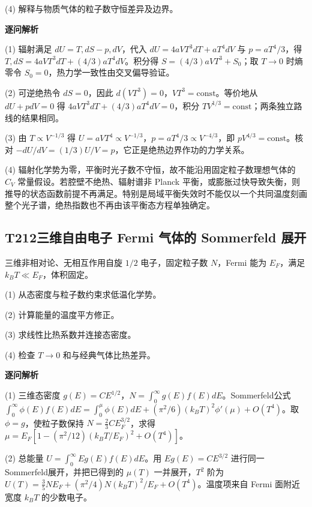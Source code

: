 (4) 解释与物质气体的粒子数守恒差异及边界。

\par\textbf{逐问解析}

(1) 辐射满足 $dU=T,dS-p,dV$，代入 $dU=4aVT^3dT+aT^4dV$ 与 $p=aT^4/3$，得 $T,dS=4aVT^3dT+(4/3)aT^4dV$。积分得 $S=(4/3)aVT^3+S_0$；取 $T\to0$ 时熵零令 $S_0=0$，热力学一致性由交叉偏导验证。

(2) 可逆绝热令 $dS=0$，因此 $d(VT^3)=0$，$VT^3=\mathrm{const}$。等价地从 $dU+pdV=0$ 得 $4aVT^3dT+(4/3)aT^4dV=0$，积分 $TV^{1/3}=\mathrm{const}$；两条独立路线的结果相同。

(3) 由 $T\propto V^{-1/3}$ 得 $U=aVT^4\propto V^{-1/3}$，$p=aT^4/3\propto V^{-4/3}$，即 $pV^{4/3}=\mathrm{const}$。核对 $-dU/dV=(1/3)U/V=p$，它正是绝热边界作功的力学关系。

(4) 辐射化学势为零，平衡时光子数不守恒，故不能沿用固定粒子数理想气体的 $C_V$ 常量假设。若腔壁不绝热、辐射谱非 Planck 平衡，或膨胀过快导致失衡，则推导的状态函数前提不再满足。特别是局域平衡失效时不能仅以一个共同温度刻画整个光子谱，绝热指数也不再由该平衡态方程单独确定。

\par\medskip

\subsection*{T212\quad 三维自由电子 Fermi 气体的 Sommerfeld 展开}

三维非相对论、无相互作用自旋 $1/2$ 电子，固定粒子数 $N$，Fermi 能为 $E_F$，满足 $k_BT\ll E_F$，体积固定。

(1) 从态密度与粒子数约束求低温化学势。

(2) 计算能量的温度平方修正。

(3) 求线性比热系数并连接态密度。

(4) 检查 $T\to0$ 和与经典气体比热差异。

\par\textbf{逐问解析}

(1) 三维态密度 $g(E)=CE^{1/2}$，$N=\int_0^\infty g(E)f(E)dE$。Sommerfeld公式 $\int_0^\infty\phi(E)f(E)dE=\int_0^\mu\phi(E)dE+(\pi^2/6)(k_BT)^2\phi'(\mu)+O(T^4)$。取 $\phi=g$，使粒子数保持 $N=\frac23 CE_F^{3/2}$，求得 $\mu=E_F[1-(\pi^2/12)(k_BT/E_F)^2+O(T^4)]$。

(2) 总能量 $U=\int_0^\infty E g(E)f(E)dE$。用 $Eg(E)=CE^{3/2}$ 进行同一Sommerfeld展开，并把已得到的 $\mu(T)$ 一并展开，$T^2$ 阶为 $U(T)=\frac35NE_F+(\pi^2/4)N(k_BT)^2/E_F+O(T^4)$。温度项来自 Fermi 面附近宽度 $k_BT$ 的少数电子。

